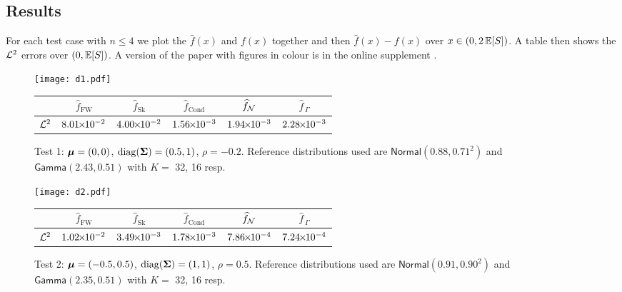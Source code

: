 

\subsection{Results}

For each test case with $n \le 4$ we plot the $\widehat{f}(x)$ and $f(x)$ together and then $\widehat{f}(x)-f(x)$ over $x \in (0, 2\operatorname{{\mathbb E}}[S])$. A table then shows the $\mathcal{L}^2$ errors over $(0, \operatorname{{\mathbb E}}[S])$. A version of the paper
with figures in colour is in the online supplement \cite{Code}.
\setlength\extrarowheight{3pt}

\begin{figure}[H]
\centering
\texttt{[image: d1.pdf]}

\vspace{4mm}

\begin{tabular}{c|c|c|c|c|c|}
\cline{2-6}
                         & $\widehat{f}_{\mathrm{FW}}$  & $\widehat{f}_{\mathrm{Sk}}$ & $\widehat{f}_{\mathrm{Cond}}$ & $\widehat{f}_{\mathcal{N}}$  & $\widehat{f}_{\,\Gamma}$ \\ \hline
\multicolumn{1}{|c|}{$\mathcal{L}^2$} & $8.01 {\mkern-2mu\times\mkern-2mu} 10^{-2}$ & $4.00 {\mkern-2mu\times\mkern-2mu} 10^{-2}$ & $1.56 {\mkern-2mu\times\mkern-2mu} 10^{-3}$ & $1.94 {\mkern-2mu\times\mkern-2mu} 10^{-3}$ & $2.28 {\mkern-2mu\times\mkern-2mu} 10^{-3}$ \\  \hline
\end{tabular}
\caption*{Test 1: $\bm{\mu} = (0, 0)$, $\mathrm{diag}(\bm{\Sigma}) = (0.5, 1)$, $\rho = -0.2$. Reference distributions used are $\mathsf{Normal}(0.88,0.71^2)$ and $\mathsf{Gamma}(2.43,0.51)$ with $K =$ 32, 16 resp.}
\end{figure}




\begin{figure}[H]
\centering
\texttt{[image: d2.pdf]}

\vspace{4mm}

\begin{tabular}{c|c|c|c|c|c|}
\cline{2-6}
                         & $\widehat{f}_{\mathrm{FW}}$  & $\widehat{f}_{\mathrm{Sk}}$ & $\widehat{f}_{\mathrm{Cond}}$ & $\widehat{f}_{\mathcal{N}}$  & $\widehat{f}_{\,\Gamma}$ \\ \hline
\multicolumn{1}{|c|}{$\mathcal{L}^2$} & $1.02 {\mkern-2mu\times\mkern-2mu} 10^{-2}$ & $3.49 {\mkern-2mu\times\mkern-2mu} 10^{-3}$ & $1.78 {\mkern-2mu\times\mkern-2mu} 10^{-3}$ & $7.86 {\mkern-2mu\times\mkern-2mu} 10^{-4}$ & $7.24 {\mkern-2mu\times\mkern-2mu} 10^{-4}$ \\ \hline
\end{tabular}
\caption*{Test 2: $\bm{\mu} = (-0.5, 0.5)$, $\mathrm{diag}(\bm{\Sigma})= (1,1)$, $\rho = 0.5$. Reference distributions used are $\mathsf{Normal}(0.91,0.90^2)$ and $\mathsf{Gamma}(2.35,0.51)$ with $K =$ 32, 16 resp.}
\end{figure}

